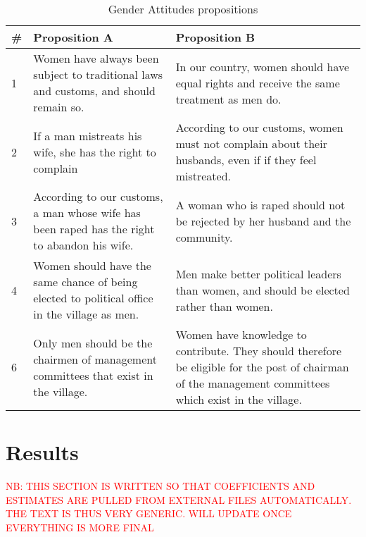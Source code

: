 \documentclass[10pt,a4paper]{scrartcl} %
\newcommand{\tableloc}{C:/Users/Koen/Dropbox/PhD/Papers/CongoGBV/Tables}
\begin{document}
\begin{table}[h]
\centering
\caption{Gender Attitudes propositions}
\label{tab:genderatt}
\begin{tabularx}{\textwidth}{l X X}
\toprule
\# & Proposition A & Proposition B \\
\hline
1 & Women have always been subject to traditional laws and customs, and should remain so. &	In our country, women should have equal rights and receive the same treatment as men do. \\
2 & If a man mistreats his wife, she has the right to complain &	According to our customs, women must not complain about their husbands, even if if they feel mistreated. \\
3 & According to our customs, a man whose wife has been raped has the right to abandon his wife. &	A woman who is raped should not be rejected by her husband and the community. \\
4 & Women should have the same chance of being elected to political office in the village as men. & 	 Men make better political leaders  than women, and should be elected rather than women. \\
6 & Only men should be the chairmen of management committees that exist in the village. &	Women have knowledge to contribute. They should therefore be eligible for the post of chairman of the management committees which exist in the village. \\
\bottomrule
\end{tabularx}
\end{table}





\section*{Results}
\textcolor{red}{NB: THIS SECTION IS WRITTEN SO THAT COEFFICIENTS AND ESTIMATES ARE PULLED FROM EXTERNAL FILES AUTOMATICALLY. THE TEXT IS THUS VERY GENERIC. WILL UPDATE ONCE EVERYTHING IS MORE FINAL}
\newcommand{\incid}[2]{\csvreader[filter strcmp={\key}{#1}]{\tableloc/incidence.csv}{key=\key,#2=\inc}{\inc}}
\end{document}
